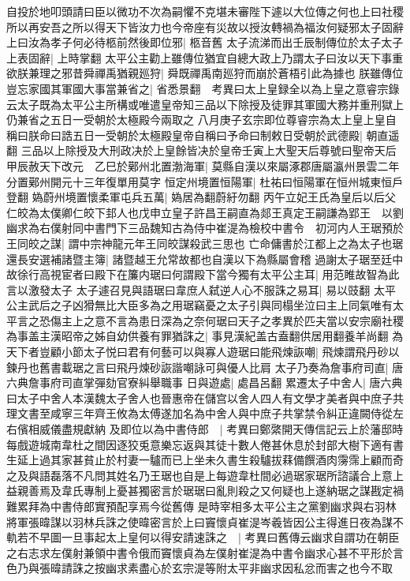 自投於地叩頭請曰臣以微功不次為嗣懼不克堪未審陛下遽以大位傳之何也上曰社稷所以再安吾之所以得天下皆汝力也今帝座有災故以授汝轉禍為福汝何疑邪太子固辭上曰汝為孝子何必待柩前然後即位邪|{
	柩音舊}
太子流涕而出壬辰制傳位於太子太子上表固辭|{
	上時掌翻}
太平公主勸上雖傳位猶宜自總大政上乃謂太子曰汝以天下事重欲朕兼理之邪昔舜禪禹猶親廵狩|{
	舜既禪禹南廵狩而崩於蒼梧引此為據也}
朕雖傳位豈忘家國其軍國大事當兼省之|{
	省悉景翻　考異曰太上皇録全以為上皇之意睿宗錄云太子既為太平公主所構或唯遣皇帝知三品以下除授及徒罪其軍國大務并重刑獄上仍兼省之五日一受朝於太極殿今兩取之}
八月庚子玄宗即位尊睿宗為太上皇上皇自稱曰朕命曰誥五日一受朝於太極殿皇帝自稱曰予命曰制敕日受朝於武德殿|{
	朝直遥翻}
三品以上除授及大刑政决於上皇餘皆决於皇帝壬寅上大聖天后尊號曰聖帝天后　甲辰赦天下改元　乙巳於鄚州北置渤海軍|{
	莫縣自漢以來屬涿郡唐屬瀛州景雲二年分置鄚州開元十三年復單用莫字}
恒定州境置恒陽軍|{
	杜祐曰恒陽軍在恒州城東恒戶登翻}
媯蔚州境置懷柔軍屯兵五萬|{
	媯居為翻蔚紆勿翻}
丙午立妃王氏為皇后以后父仁皎為太僕卿仁皎下邽人也戊申立皇子許昌王嗣直為郯王真定王嗣謙為郢王　以劉幽求為右僕射同中書門下三品魏知古為侍中崔湜為檢校中書令　初河内人王琚預於王同皎之謀|{
	謂中宗神龍元年王同皎謀殺武三思也}
亡命傭書於江都上之為太子也琚還長安選補諸暨主簿|{
	諸暨越王允常故都也自漢以下為縣屬會稽}
過謝太子琚至廷中故徐行高視宦者曰殿下在簾内琚曰何謂殿下當今獨有太平公主耳|{
	用范睢故智為此言以激發太子}
太子遽召見與語琚曰韋庶人弑逆人心不服誅之易耳|{
	易以豉翻}
太平公主武后之子凶猾無比大臣多為之用琚竊憂之太子引與同榻坐泣曰主上同氣唯有太平言之恐傷主上之意不言為患日深為之奈何琚曰天子之孝異於匹夫當以安宗廟社稷為事盖主漢昭帝之姊自幼供養有罪猶誅之|{
	事見漢紀盖古盍翻供居用翻養羊尚翻}
為天下者豈顧小節太子悦曰君有何藝可以與寡人遊琚曰能飛煉詼嘲|{
	飛煉謂飛丹砂以鍊丹也舊書載琚之言曰飛丹煉砂詼諧嘲詠可與優人比肩}
太子乃奏為詹事府司直|{
	唐六典詹事府司直掌彈劾官寮糾舉職事}
日與遊處|{
	處昌呂翻}
累遷太子中舍人|{
	唐六典曰太子中舍人本漢魏太子舍人也晉惠帝在儲宫以舍人四人有文學才美者與中庶子共理文書至咸寧三年齊王攸為太傅遂加名為中舍人與中庶子共掌禁令糾正違闕侍從左右儐相威儀盡規獻納}
及即位以為中書侍郎　|{
	考異曰鄭綮開天傳信記云上於藩邸時每戲遊城南韋杜之間因逐狡兎意樂忘返與其徒十數人倦甚休息於封部大樹下適有書生延上過其家甚貧止於村妻一驢而已上坐未久書生殺驢拔䔉備饌酒肉霶霈上顧而奇之及與語磊落不凡問其姓名乃王琚也自是上每遊韋杜間必過琚家琚所諮議合上意上益親善焉及韋氏專制上憂甚獨密言於琚琚曰亂則殺之又何疑也上遂納琚之謀戡定禍難累拜為中書侍郎實預配享焉今從舊傳}
是時宰相多太平公主之黨劉幽求與右羽林將軍張暐謀以羽林兵誅之使暐密言於上曰竇懷貞崔湜岑羲皆因公主得進日夜為謀不軌若不早圖一旦事起太上皇何以得安請速誅之　|{
	考異曰舊傳云幽求自謂功在朝臣之右志求左僕射兼領中書令俄而竇懷貞為左僕射崔湜為中書令幽求心甚不平形於言色乃與張暐請誅之按幽求素盡心於玄宗湜等附太平非幽求因私忿而害之也今不取}
